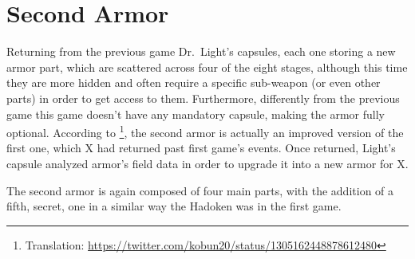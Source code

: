 \section{Second Armor}\label{X2:Armor}
Returning from the previous game Dr.~Light's capsules, each one storing a new armor part, which are scattered across four of the eight stages, although this time they are more hidden and often require a specific sub-weapon (or even other parts) in order to get access to them. Furthermore, differently from the previous game this game doesn't have any mandatory capsule, making the armor fully optional.
According to \cite{tw:second_armor}\footnote{Translation: \url{https://twitter.com/kobun20/status/1305162448878612480}}, the second armor is actually an improved version of the first one, which X had returned past first game's events. Once returned, Light's capsule analyzed armor's field data in order to upgrade it into a new armor for X.

The second armor is again composed of four main parts, with the addition of a fifth, secret, one in a similar way the Hadoken was in the first game.

